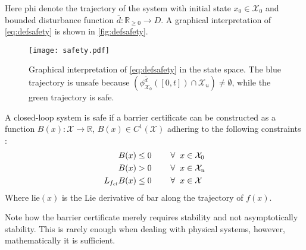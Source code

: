 %

Here \gls{phi} denote the trajectory of the system with initial state $x_0\in \mathcal{X}_0$ and bounded disturbance function $\bar{d}:\mathbb{R}_{\geq 0} \rightarrow D$. A graphical interpretation of \autoref{eq:defsafety} is shown in \autoref{fig:defsafety}.

\begin{figure}[H]
	\center
	\texttt{[image: safety.pdf]}	
	\caption{Graphical interpretation of \autoref{eq:defsafety} in the state space. The blue trajectory is unsafe because $\left( \phi_{\mathcal{X}_0}^{\bar{d}}([0,t]) \cap \mathcal{X}_u \right) \neq \emptyset$, while the green trajectory is safe.}
	\label{fig:defsafety}
\end{figure}
\label{def_safety}

\begin{exa}\label{def:barrier_certificate}	
A closed-loop system is safe if a barrier certificate can be constructed as a function $B(x):\mathcal{X} \rightarrow \mathbb{R}$, $B(x) \in C^1(\mathcal{X})$ adhering to the following constraints  \citep{bib:org_control,bib:barrier_prajna}:
\begin{subequations}\label{eq:barrier_constraints}
\begin{flalign}
B(x) &\leq 0 \hspace{0.8cm}  \forall \hspace{2mm} x \in \mathcal{X}_0  \label{cer1}\\
B(x) &> 0  \hspace{0.8cm}  \forall \hspace{2mm} x \in \mathcal{X}_u \label{cer2} \\
L_{f_{cl}}B(x) &\leq 0 \hspace{0.8cm}  \forall \hspace{2mm} x \in \mathcal{X} \label{cer3}
\end{flalign}
\end{subequations}
Where \gls{lie}$(x)$ is the Lie derivative of \gls{bar} along the trajectory of $f(x)$. 
\end{exa}
Note how the barrier certificate merely requires stability and not asymptotically stability. This is rarely enough when dealing with physical systems, however, mathematically it is sufficient.

